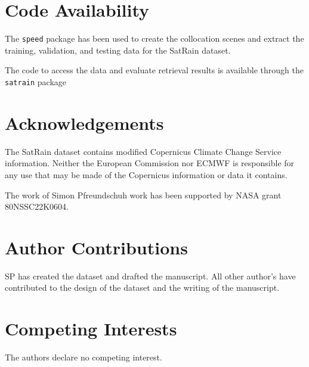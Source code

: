 \documentclass[11pt]{article}
\begin{document}
\section*{Code Availability}

The \texttt{speed} package \citep{Speed2025} has been used to create the
collocation scenes and extract the training, validation, and testing data for
the SatRain dataset.

The code to access the data and evaluate retrieval results is available through
the \texttt{satrain} package \citep{SatRain2025}

\section*{Acknowledgements}


The SatRain dataset contains modified Copernicus Climate Change Service
information. Neither the European Commission nor ECMWF is responsible for any
use that may be made of the Copernicus information or data it contains.

The work of Simon Pfreundschuh work has been supported by NASA grant 80NSSC22K0604.


\section*{Author Contributions}

SP has created the dataset and drafted the manuscript. All other author's have
contributed to the design of the dataset and the writing of the manuscript.


\section*{Competing Interests}

The authors declare no competing interest.




\end{document}
